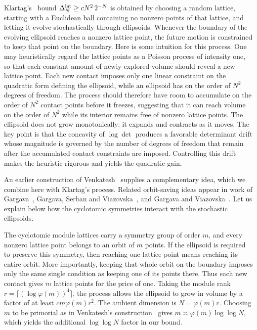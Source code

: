 \documentclass[11pt]{article}
\theoremstyle{remark}
\begin{document}
Klartag's~\cite{Klartag} bound $\Delta_N^{\rm lat}\ge cN^2\,2^{-N}$
is obtained by choosing a random lattice, starting with a Euclidean ball
containing no nonzero points of that lattice, and letting it evolve
stochastically through ellipsoids.  Whenever the boundary of the evolving
ellipsoid reaches a nonzero lattice point, the future motion is constrained to
keep that point on the boundary.  Here is some intuition for this process.  One
may heuristically regard the lattice points as a Poisson process of intensity
one, so that each constant amount of newly explored volume should reveal a new
lattice point.
Each new contact imposes only one linear constraint on the quadratic form
defining the ellipsoid, while an ellipsoid has on the order of $N^2$ degrees
of freedom.  The process should therefore have room to accumulate on the order
of $N^2$ contact points before it freezes, suggesting that it can reach volume
on the order of $N^2$ while its interior remains free of nonzero lattice
points.  The ellipsoid does not grow monotonically: it expands and contracts
as it moves.  The key point is that the concavity of $\log\det$ produces a
favorable determinant drift whose magnitude is governed by the number of
degrees of freedom that remain after the accumulated contact constraints are
imposed.  Controlling this drift makes the heuristic rigorous and yields the
quadratic gain.

An earlier construction of Venkatesh~\cite{Venkatesh} supplies a complementary
idea, which we combine here with Klartag's process.
Related orbit-saving ideas appear
in work of Gargava~\cite{Gargava}, Gargava, Serban and Viazovska~\cite{GSV}, and
Gargava and
Viazovska~\cite{GargavaViazovska}.
Let us explain below how the cyclotomic symmetries interact with the stochastic ellipsoids.

The
cyclotomic module lattices carry a symmetry group of order $m$, and every
nonzero lattice point belongs to an orbit of $m$ points.  If the ellipsoid is
required to preserve this symmetry, then reaching one lattice point means
reaching its entire orbit.  More importantly, keeping that whole orbit on the
boundary imposes only the same single condition as keeping one of its points
there.
Thus each new contact gives $m$ lattice points for the price of one.  Taking
the module rank $r=\lceil(\log\varphi(m))^4\rceil$, the process allows the
ellipsoid to grow in volume by a factor of at least $cm\varphi(m)r^2$.  The
ambient dimension is $N=\varphi(m)r$.  Choosing $m$ to be primorial as in
Venkatesh's construction~\cite{Venkatesh} gives
$m\asymp\varphi(m)\log\log N$, which yields the additional $\log\log N$
factor in our bound.
\end{document}
